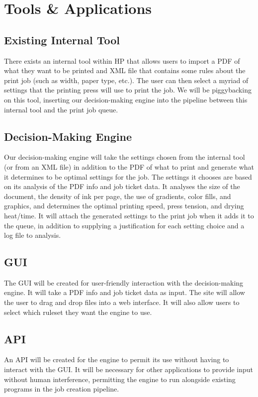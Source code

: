 \documentclass[onecolumn, draftclsnofoot,10pt, compsoc]{IEEEtran}
\begin{document}
\section{Tools \& Applications}
\subsection{Existing Internal Tool}
There exists an internal tool within HP that allows users to import a PDF of what they want to be printed and XML file that contains some rules about the print job (such as width, paper type, etc.). The user can then select a myriad of settings that the printing press will use to print the job. We will be piggybacking on this tool, inserting our decision-making engine into the pipeline between this internal tool and the print job queue.

\subsection{Decision-Making Engine}
Our decision-making engine will take the settings chosen from the internal tool (or from an XML file) in addition to the PDF of what to print and generate what it determines to be optimal settings for the job. The settings it chooses are based on its analysis of the PDF info and job ticket data. It analyses the size of the document, the density of ink per page, the use of gradients, color fills, and graphics, and determines the optimal printing speed, press tension, and drying heat/time. It will attach the generated settings to the print job when it adds it to the queue, in addition to supplying a justification for each setting choice and a log file to analysis.

\subsection{GUI}
The GUI will be created for user-friendly interaction with the decision-making engine. It will take a PDF info and job ticket data as input. The site will allow the user to drag and drop files into a web interface. It will also allow users to select which ruleset they want the engine to use.

\subsection{API}
An API will be created for the engine to permit its use without having to interact with the GUI. It will be necessary for other applications to provide input without human interference, permitting the engine to run alongside existing programs in the job creation pipeline.
\end{document}
